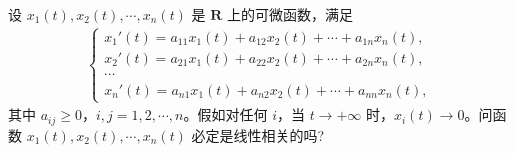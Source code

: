 \documentclass[../../main.tex]{subfiles}%
\begin{document}
\begin{example}
设 $x_1(t), x_2(t), \cdots, x_n(t)$ 是 $\mathbf{R}$ 上的可微函数，满足
\begin{align*}
\begin{cases}
x_1'(t) = a_{11}x_1(t) + a_{12}x_2(t) + \cdots + a_{1n}x_n(t), \\
x_2'(t) = a_{21}x_1(t) + a_{22}x_2(t) + \cdots + a_{2n}x_n(t), \\
\cdots \\
x_n'(t) = a_{n1}x_1(t) + a_{n2}x_2(t) + \cdots + a_{nn}x_n(t),
\end{cases}
\end{align*}
其中 $a_{ij} \geqslant 0$，$i, j = 1, 2, \cdots, n$。假如对任何 $i$，当 $t \to +\infty$ 时，$x_i(t) \to 0$。问函数 $x_1(t), x_2(t), \cdots, x_n(t)$ 必定是线性相关的吗?
\end{example}
\end{document}
